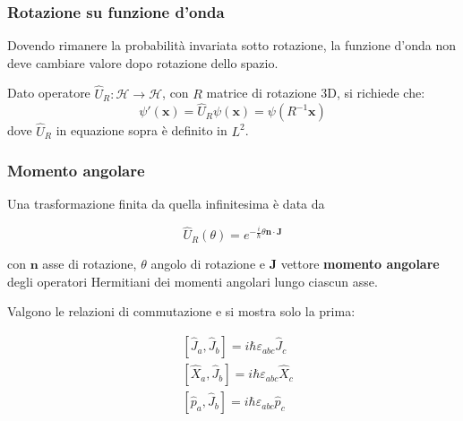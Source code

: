\documentclass[10pt, a4paper]{scrartcl} %
\numberwithin{equation}{subsection}
\theoremstyle{style2}
\theoremstyle{style1}
\newenvironment{boxenv}[1][]{
    \begin{eqbox}[#1]
    }{
   \end{eqbox}
}
\begin{document}
\subsubsection{Rotazione su funzione d'onda}

Dovendo rimanere la probabilit\`a invariata sotto rotazione, la funzione d'onda non deve cambiare valore dopo rotazione dello spazio. 

Dato operatore $\hat{U}_R:\mathcal{H}\to \mathcal{H}$, con $R$ matrice di rotazione 3D, si richiede che:
\begin{equation}
	\psi '(\mathbf{x} )= \hat{U}_R \psi (\mathbf{x} ) = \psi (R^{-1} \mathbf{x} )
\end{equation}
dove $\hat{U}_R$ in equazione sopra \`e definito in $L^{2} $.

\subsubsection{Momento angolare}
Una trasformazione finita da quella infinitesima \`e data da
\begin{boxenv}[]
\begin{equation}
	\hat{U}_R(\theta ) = e^{-\frac{i}{\hbar }\theta \mathbf{n} \cdot \mathbf{J} } 
\end{equation}
\end{boxenv}
\noindent con $\mathbf{n} $ asse di rotazione, $\theta $ angolo di rotazione e \textbf{J} vettore \textbf{momento angolare} degli operatori Hermitiani dei momenti angolari lungo ciascun asse.

Valgono le relazioni di commutazione e si mostra solo la prima:
\begin{boxenv}[]
\begin{equation}
	\begin{split}
		&[\hat{J}_a, \hat{J}_b] = i\hbar \varepsilon _{abc} \hat{J}_c\\
		& [\hat{X}_a , \hat{J}_b] = i \hbar \varepsilon _{abc} \hat{X}_c\\
		& [\hat{p}_a , \hat{J}_b] = i \hbar \varepsilon _{abc} \hat{p}_c
	\end{split}
\end{equation}
\end{boxenv}
\end{document}

